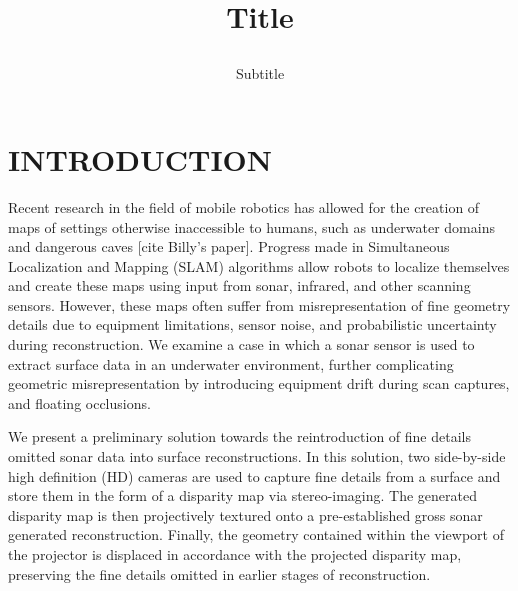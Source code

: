 \documentclass[a4paper,twoside]{article}
\begin{document}
\title{Title  \subtitle{Subtitle} }

\author{
}



\onecolumn \maketitle \normalsize \vfill

\section{\uppercase{Introduction}}
\label{sec:introduction}


\noindent Recent research in the field of mobile robotics has allowed for the creation of maps of settings otherwise inaccessible to humans, such as underwater domains and dangerous caves [cite Billy's paper]. Progress made in Simultaneous Localization and Mapping (SLAM) algorithms allow robots to localize themselves and create these maps using input from sonar, infrared, and other scanning sensors. However, these maps often suffer from misrepresentation of fine geometry details due to equipment limitations, sensor noise, and probabilistic uncertainty during reconstruction. We examine a case in which a sonar sensor is used to extract surface data in an underwater environment, further complicating geometric misrepresentation by introducing equipment drift during scan captures, and floating occlusions.

We present a preliminary solution towards the reintroduction of fine details omitted sonar data into surface reconstructions. In this solution, two side-by-side high definition (HD) cameras are used to capture fine details from a surface and store them in the form of a disparity map via stereo-imaging. The generated disparity map is then projectively textured onto a pre-established gross sonar generated reconstruction. Finally, the geometry contained within the viewport of the projector is displaced in accordance with the projected disparity map, preserving the fine details omitted in earlier stages of reconstruction.
\end{document}
